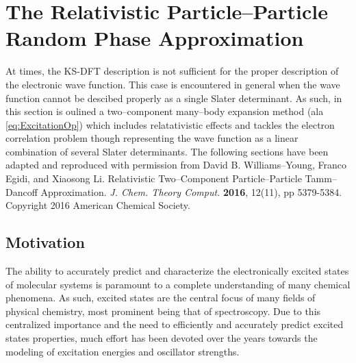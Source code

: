 






\section{The Relativistic Particle--Particle Random Phase Approximation}

At times, the KS-DFT description is not sufficient for the proper description
of the electronic wave function. This case is encountered in general when
the wave function cannot be descibed properly as a single Slater determinant.
As such, in this section is oulined a two--component many--body expansion 
method (ala \cref{eq:ExcitationOp}) which includes relatativistic effects
and tackles the electron correlation problem though representing the wave function
as a linear combination of several Slater determinants. The following sections
have been adapted and reproduced with permission from David B. Williams--Young,
Franco Egidi, and Xiaosong Li. Relativistic Two--Component Particle--Particle
Tamm--Dancoff Approximation. \emph{J. Chem. Theory Comput.} \textbf{2016}, 12(11),
pp 5379-5384. Copyright 2016 American Chemical Society.




\subsection{Motivation}

The ability to accurately predict and characterize the electronically excited
states of molecular systems is paramount to a complete understanding of many
chemical phenomena. As such, excited states are the central focus of many
fields of physical chemistry, most prominent being that of spectroscopy. Due to
this centralized importance and the need to efficiently and accurately predict
excited states properties, much  effort has been devoted over the years towards
the modeling of excitation energies and oscillator strengths.


